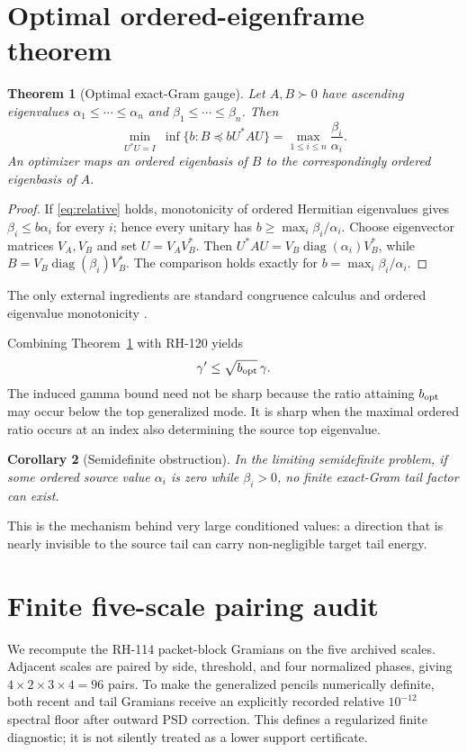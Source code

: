 \documentclass[12pt]{article}
\newtheorem{theorem}{Theorem}
\newtheorem{corollary}[theorem]{Corollary}
\begin{document}
\section{Optimal ordered-eigenframe theorem}
\begin{theorem}[Optimal exact-Gram gauge]\label{thm:optimal}
Let $A,B\succ0$ have ascending eigenvalues
$\alpha_1\leq\cdots\leq\alpha_n$ and
$\beta_1\leq\cdots\leq\beta_n$.  Then
\[
 \min_{U^*U=I}\ \inf\{b:B\preceq bU^*AU\}
 =\max_{1\leq i\leq n}\frac{\beta_i}{\alpha_i}.
\]
An optimizer maps an ordered eigenbasis of $B$ to the correspondingly
ordered eigenbasis of $A$.
\end{theorem}
\begin{proof}
If \eqref{eq:relative} holds, monotonicity of ordered Hermitian eigenvalues
gives $\beta_i\leq b\alpha_i$ for every $i$; hence every unitary has
$b\geq\max_i\beta_i/\alpha_i$.  Choose eigenvector matrices $V_A,V_B$ and
set $U=V_AV_B^*$.  Then
$U^*AU=V_B\operatorname{diag}(\alpha_i)V_B^*$, while
$B=V_B\operatorname{diag}(\beta_i)V_B^*$.  The comparison holds exactly for
$b=\max_i\beta_i/\alpha_i$.
\end{proof}
The only external ingredients are standard congruence calculus and ordered
eigenvalue monotonicity \citep{Bhatia2007,HornJohnson1991}.

Combining Theorem~\ref{thm:optimal} with RH-120 yields
\[
 \gamma'\leq\sqrt{b_{\rm opt}}\,\gamma.
\]
The induced gamma bound need not be sharp because the ratio attaining
$b_{\rm opt}$ may occur below the top generalized mode.  It is sharp when
the maximal ordered ratio occurs at an index also determining the source
top eigenvalue.

\begin{corollary}[Semidefinite obstruction]
In the limiting semidefinite problem, if some ordered source value
$\alpha_i$ is zero while $\beta_i>0$, no finite exact-Gram tail factor can
exist.
\end{corollary}
This is the mechanism behind very large conditioned values: a direction
that is nearly invisible to the source tail can carry non-negligible target
tail energy.

\section{Finite five-scale pairing audit}
We recompute the RH-114 packet-block Gramians on the five archived scales.
Adjacent scales are paired by side, threshold, and four normalized phases,
giving $4\times2\times3\times4=96$ pairs.  To make the generalized pencils
numerically definite, both recent and tail Gramians receive an explicitly
recorded relative $10^{-12}$ spectral floor after outward PSD correction.
This defines a regularized finite diagnostic; it is not silently treated as
a lower support certificate.
\end{document}
